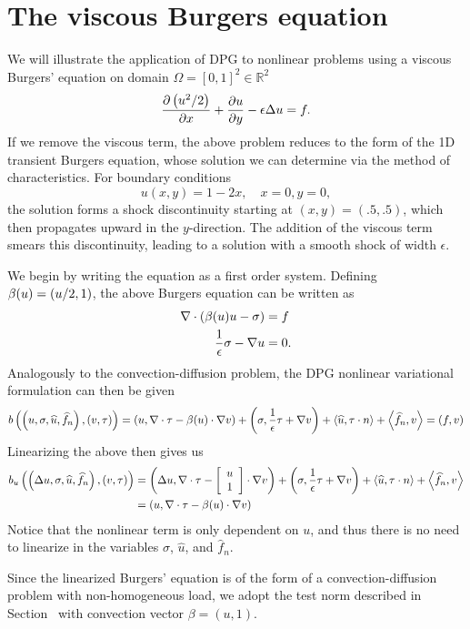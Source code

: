 \section{The viscous Burgers equation}

We will illustrate the application of DPG to nonlinear problems using a viscous Burgers' equation on domain $\Omega = [0,1]^2 \in \mathbb{R}^2$
\[
\pd{\left(u^2/2\right)}{x} + \pd{u}{y} - \epsilon \Delta u = f.
\]
If we remove the viscous term, the above problem reduces to the form of the 1D transient Burgers equation, whose solution we can determine via the method of characteristics.  For boundary conditions 
\[
u(x,y) = 1-2x, \quad x = 0, y = 0,
\]
the solution forms a shock discontinuity starting at $(x,y) = (.5,.5)$, which then propagates upward in the $y$-direction.  The addition of the viscous term smears this discontinuity, leading to a solution with a smooth shock of width $\epsilon$.  

We begin by writing the equation as a first order system.  Defining $\beta(u) = \LRp{u/2,1}$, the above Burgers equation can be written as 
\begin{align*}
\div\left(\beta(u)u-\sigma\right) &=f \\
\frac{1}{\epsilon}\sigma - \grad u &=0.
\end{align*}
Analogously to the convection-diffusion problem, the DPG nonlinear variational formulation can then be given
\[
b\left(\left(u,\sigma,\widehat{u},\widehat{f}_n\right),\left(v,\tau\right)\right) = \LRp{u,\div \tau - \beta(u) \cdot \grad v} + \LRp{\sigma, \frac{1}{\epsilon}\tau + \grad v} + \LRa{\widehat{u},\tau\cdot n} + \LRa{\widehat{f}_n,v} = \LRp{f,v}
\]
Linearizing the above then gives us 
\begin{align*}
b_u\left(\left(\Delta u,\sigma,\widehat{u},\widehat{f}_n\right),\left(v,\tau\right)\right) &= \LRp{\Delta u,\div \tau - \vecttwo{u}{1} \cdot \grad v} + \LRp{\sigma, \frac{1}{\epsilon}\tau + \grad v} + \LRa{\widehat{u},\tau\cdot n} + \LRa{\widehat{f}_n,v} \\
&= \LRp{u,\div \tau - \beta(u)\cdot \grad v} 
\end{align*}
Notice that the nonlinear term is only dependent on $u$, and thus there is no need to linearize in the variables $\sigma$, $\widehat{u}$, and $\widehat{f}_n$.  

Since the linearized Burgers' equation is of the form of a convection-diffusion problem with non-homogeneous load, we adopt the test norm described in Section~ with convection vector $\beta = (u,1)$.  


